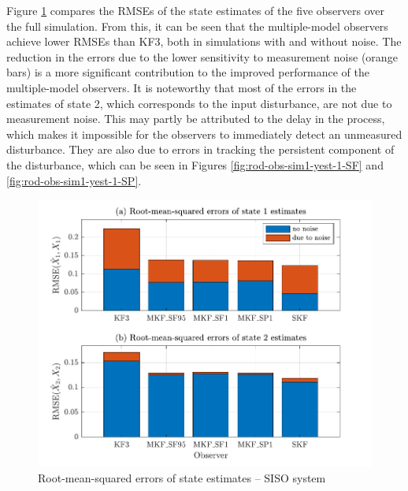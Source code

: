 Figure \ref{fig:rod-obs-sim1-xest-RMSE-bar} compares the \gls{RMSE}s of the state estimates of the five observers over the full simulation. From this, it can be seen that the multiple-model observers achieve lower \gls{RMSE}s than KF3, both in simulations with and without noise. The reduction in the errors due to the lower sensitivity to measurement noise (orange bars) is a more significant contribution to the improved performance of the multiple-model observers. It is noteworthy that most of the errors in the estimates of state 2, which corresponds to the input disturbance, are not due to measurement noise. This may partly be attributed to the delay in the process, which makes it impossible for the observers to immediately detect an unmeasured disturbance. They are also due to errors in tracking the persistent component of the disturbance, which can be seen in Figures \ref{fig:rod-obs-sim1-yest-1-SF} and \ref{fig:rod-obs-sim1-yest-1-SP}.
\begin{figure}[htp]
	\centering
	\includegraphics[width=12cm]{images/rod_obs_sim1_all_seed_x_err_bar.pdf}
	\caption{Root-mean-squared errors of state estimates – \gls{SISO} system}
	\label{fig:rod-obs-sim1-xest-RMSE-bar}
\end{figure}

